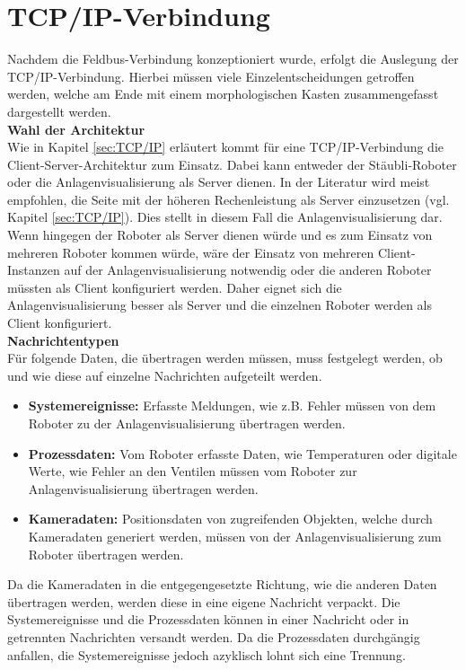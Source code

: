 \documentclass[ a4paper,
                oneside,
                toc=bibliography,
                toc=listof
                ]{scrbook}
\begin{document}
	\section{TCP/IP-Verbindung}
	\label{sec:KonzeptTCPIP}
	Nachdem die Feldbus-Verbindung konzeptioniert wurde, erfolgt die Auslegung der TCP/IP-Verbindung. Hierbei müssen viele Einzelentscheidungen getroffen werden, welche am Ende mit einem morphologischen Kasten zusammengefasst dargestellt werden.\\
	\textbf{Wahl der Architektur} \\
	Wie in Kapitel \ref{sec:TCP/IP} erläutert kommt für eine TCP/IP-Verbindung die Client-Server-Architektur zum Einsatz. Dabei kann entweder der Stäubli-Roboter oder die Anlagenvisualisierung als Server dienen. In der Literatur wird meist empfohlen, die Seite mit der höheren Rechenleistung als Server einzusetzen (vgl. Kapitel \ref{sec:TCP/IP}). Dies stellt in diesem Fall die Anlagenvisualisierung dar. Wenn hingegen der Roboter als Server dienen würde und es zum Einsatz von mehreren Roboter kommen würde, wäre der Einsatz von mehreren Client-Instanzen auf der Anlagenvisualisierung notwendig oder die anderen Roboter müssten als Client konfiguriert werden. Daher eignet sich die Anlagenvisualisierung besser als Server und die einzelnen Roboter werden als Client konfiguriert. \\
	\textbf{Nachrichtentypen}\\
	Für folgende Daten, die übertragen werden müssen, muss festgelegt werden, ob und wie diese auf einzelne Nachrichten aufgeteilt werden.
	\begin{itemize}
		\item \textbf{Systemereignisse: } Erfasste Meldungen, wie z.B. Fehler müssen von dem Roboter zu der Anlagenvisualisierung übertragen werden.
		\item \textbf{Prozessdaten: } Vom Roboter erfasste Daten, wie Temperaturen oder digitale Werte, wie Fehler an den Ventilen müssen vom Roboter zur Anlagenvisualisierung übertragen werden.
		\item \textbf{Kameradaten:} Positionsdaten von zugreifenden Objekten, welche durch Kameradaten generiert werden, müssen von der Anlagenvisualisierung zum Roboter übertragen werden.\\
	\end{itemize}
	Da die Kameradaten in die entgegengesetzte Richtung, wie die anderen Daten übertragen werden, werden diese in eine eigene Nachricht verpackt. Die Systemereignisse und die Prozessdaten können in einer Nachricht oder in getrennten Nachrichten versandt werden. Da die Prozessdaten durchgängig anfallen, die Systemereignisse jedoch azyklisch lohnt sich eine Trennung.\\
\end{document}
